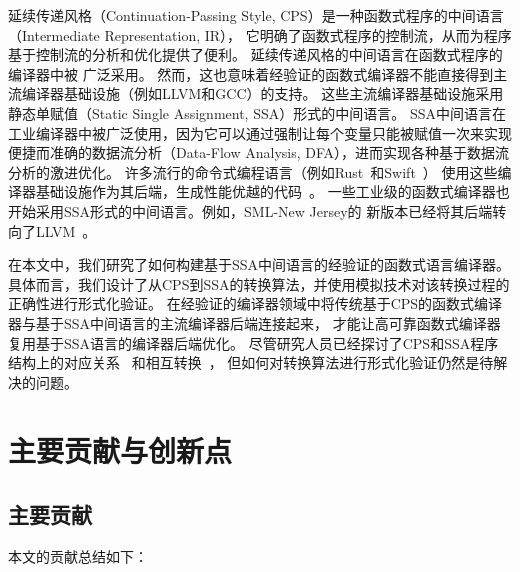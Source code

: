 延续传递风格（Continuation-Passing Style, CPS）是一种函数式程序的中间语言（Intermediate Representation, IR），
它明确了函数式程序的控制流，从而为程序基于控制流的分析和优化提供了便利。
延续传递风格的中间语言在函数式程序的编译器中被
广泛采用\cite{belanger-cpp2013,dargaye2009verification,zoe-oopsla2021,zoe-icfp2021,wang-esop2016}。
然而，这也意味着经验证的函数式编译器不能直接得到主流编译器基础设施（例如LLVM和GCC）的支持。
这些主流编译器基础设施采用静态单赋值（Static Single Assignment, SSA）形式的中间语言。 
SSA中间语言在工业编译器中被广泛使用，因为它可以通过强制让每个变量只能被赋值一次来实现
便捷而准确的数据流分析（Data-Flow Analysis, DFA），进而实现各种基于数据流分析的激进优化。
许多流行的命令式编程语言（例如Rust~\cite{balasubramanian2017system}和Swift~\cite{zhang2012swift}）
使用这些编译器基础设施作为其后端，生成性能优越的代码~\cite{lattner2006introduction}。
一些工业级的函数式编译器也开始采用SSA形式的中间语言。例如，SML-New Jersey的
新版本已经将其后端转向了LLVM~\cite{farvardin2020new}。

在本文中，我们研究了如何构建基于SSA中间语言的经验证的函数式语言编译器。
具体而言，我们设计了从CPS到SSA的转换算法，并使用模拟技术对该转换过程的正确性进行形式化验证。
在经验证的编译器领域中将传统基于CPS的函数式编译器与基于SSA中间语言的主流编译器后端连接起来，
才能让高可靠函数式编译器复用基于SSA语言的编译器后端优化。
尽管研究人员已经探讨了CPS和SSA程序结构上的对应关系~\cite{appel1998ssa,ssabook}
和相互转换~\cite{farvardin2020new,kelsey1995correspondence}，
但如何对转换算法进行形式化验证仍然是待解决的问题。

\section{主要贡献与创新点}

\subsection{主要贡献}
本文的贡献总结如下：


